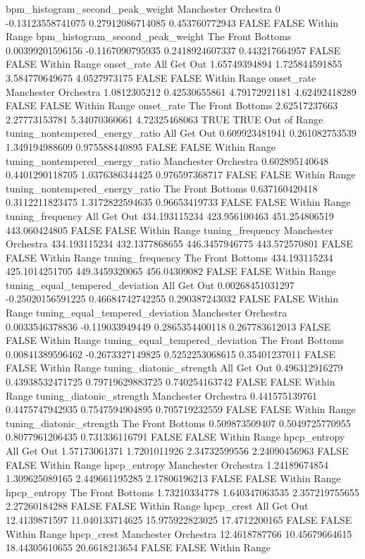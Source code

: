 bpm_histogram_second_peak_weight Manchester Orchestra 0 -0.13123558741075 0.27912086714085 0.453760772943 FALSE FALSE Within Range
bpm_histogram_second_peak_weight The Front Bottoms 0.00399201596156 -0.1167090795935 0.2418924607337 0.443217664957 FALSE FALSE Within Range
onset_rate All Get Out 1.65749394894 1.725844591855 3.584770649675 4.0527973175 FALSE FALSE Within Range
onset_rate Manchester Orchestra 1.0812305212 0.42530655861 4.79172921181 4.62492418289 FALSE FALSE Within Range
onset_rate The Front Bottoms 2.62517237663 2.27773153781 5.34070360661 4.72325468063 TRUE TRUE Out of Range
tuning_nontempered_energy_ratio All Get Out 0.609923481941 0.261082753539 1.349194988609 0.975588440895 FALSE FALSE Within Range
tuning_nontempered_energy_ratio Manchester Orchestra 0.602895140648 0.4401290118705 1.0376386344425 0.976597368717 FALSE FALSE Within Range
tuning_nontempered_energy_ratio The Front Bottoms 0.637160420418 0.3112211823475 1.3172822594635 0.96653419733 FALSE FALSE Within Range
tuning_frequency All Get Out 434.193115234 423.956100463 451.254806519 443.060424805 FALSE FALSE Within Range
tuning_frequency Manchester Orchestra 434.193115234 432.1377868655 446.3457946775 443.572570801 FALSE FALSE Within Range
tuning_frequency The Front Bottoms 434.193115234 425.1014251705 449.3459320065 456.04309082 FALSE FALSE Within Range
tuning_equal_tempered_deviation All Get Out 0.00268451031297 -0.25020156591225 0.46684742742255 0.290387243032 FALSE FALSE Within Range
tuning_equal_tempered_deviation Manchester Orchestra 0.0033546378836 -0.119033949449 0.2865354400118 0.267783612013 FALSE FALSE Within Range
tuning_equal_tempered_deviation The Front Bottoms 0.00841389596462 -0.2673327149825 0.5252253068615 0.35401237011 FALSE FALSE Within Range
tuning_diatonic_strength All Get Out 0.496312916279 0.43938532471725 0.79719629883725 0.740254163742 FALSE FALSE Within Range
tuning_diatonic_strength Manchester Orchestra 0.441575139761 0.4475747942935 0.7547594904895 0.705719232559 FALSE FALSE Within Range
tuning_diatonic_strength The Front Bottoms 0.509873509407 0.5049725770955 0.8077961206435 0.731336116791 FALSE FALSE Within Range
hpcp_entropy All Get Out 1.57173061371 1.7201011926 2.34732599556 2.24090456963 FALSE FALSE Within Range
hpcp_entropy Manchester Orchestra 1.24189674854 1.309625089165 2.449661195285 2.17806196213 FALSE FALSE Within Range
hpcp_entropy The Front Bottoms 1.73210334778 1.640347063535 2.357219755655 2.27260184288 FALSE FALSE Within Range
hpcp_crest All Get Out 12.4139871597 11.040133714625 15.975922823025 17.4712200165 FALSE FALSE Within Range
hpcp_crest Manchester Orchestra 12.4618787766 10.45679664615 18.44305610655 20.6618213654 FALSE FALSE Within Range
